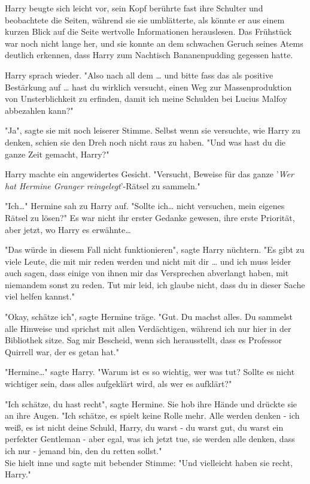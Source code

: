 {Harry beugte sich leicht vor, sein Kopf berührte fast ihre Schulter und beobachtete die Seiten, während sie sie umblätterte, als könnte er aus einem kurzen Blick auf die Seite wertvolle Informationen herauslesen. Das Frühstück war noch nicht lange her, und sie konnte an dem schwachen Geruch seines Atems deutlich erkennen, dass Harry zum Nachtisch Bananenpudding gegessen hatte.

Harry sprach wieder. "Also nach all dem … und bitte fass das als positive Bestärkung auf … hast du wirklich versucht, einen Weg zur Massenproduktion von Unsterblichkeit zu erfinden, damit ich meine Schulden bei Lucius Malfoy abbezahlen kann?"

"Ja", sagte sie mit noch leiserer Stimme. Selbst wenn sie versuchte, wie Harry zu denken, schien sie den Dreh noch nicht raus zu haben. "Und was hast du die ganze Zeit gemacht, Harry?"

Harry machte ein angewidertes Gesicht. "Versucht, Beweise für das ganze '\emph{Wer hat Hermine Granger reingelegt}'-Rätsel zu sammeln."

"Ich…" Hermine sah zu Harry auf. "Sollte ich… nicht versuchen, mein eigenes Rätsel zu lösen?" Es war nicht ihr erster Gedanke gewesen, ihre erste Priorität, aber jetzt, wo Harry es erwähnte…

"Das würde in diesem Fall nicht funktionieren", sagte Harry nüchtern. "Es gibt zu viele Leute, die mit mir reden werden und nicht mit dir … und ich muss leider auch sagen, dass einige von ihnen mir das Versprechen abverlangt haben, mit niemandem sonst zu reden. Tut mir leid, ich glaube nicht, dass du in dieser Sache viel helfen kannst."

"Okay, schätze ich", sagte Hermine träge. "Gut. Du machst alles. Du sammelst alle Hinweise und sprichst mit allen Verdächtigen, während ich nur hier in der Bibliothek sitze. Sag mir Bescheid, wenn sich herausstellt, dass es Professor Quirrell war, der es getan hat."

"Hermine…" sagte Harry. "Warum ist es so wichtig, wer was tut? Sollte es nicht wichtiger sein, dass alles aufgeklärt wird, als wer es aufklärt?"

"Ich schätze, du hast recht", sagte Hermine. Sie hob ihre Hände und drückte sie an ihre Augen. "Ich schätze, es spielt keine Rolle mehr. Alle werden denken - ich weiß, es ist nicht deine Schuld, Harry, du warst - du warst gut, du warst ein perfekter Gentleman - aber egal, was ich jetzt tue, sie werden alle denken, dass ich nur - jemand bin, den du retten sollst."\\ Sie hielt inne und sagte mit bebender Stimme: "Und vielleicht haben sie recht, Harry."

}

